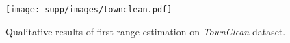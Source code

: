 \begin{figure}[t]
\centering
\texttt{[image: supp/images/townclean.pdf]}

\caption{Qualitative results of first range estimation on \textit{TownClean} dataset.}
\label{fig:supp_townclean}

\end{figure}